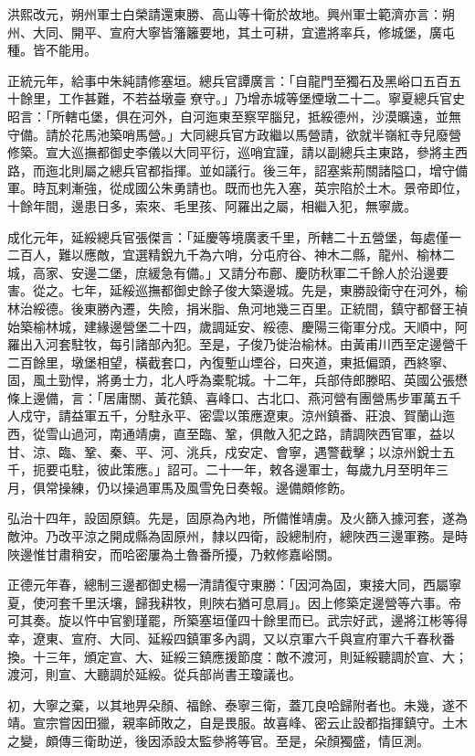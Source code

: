 洪熙改元，朔州軍士白榮請還東勝、高山等十衛於故地。興州軍士範濟亦言：朔州、大同、開平、宣府大寧皆籓籬要地，其土可耕，宜遣將率兵，修城堡，廣屯種。皆不能用。

正統元年，給事中朱純請修塞垣。總兵官譚廣言：「自龍門至獨石及黑峪口五百五十餘里，工作甚難，不若益墩臺尞守。」乃增赤城等堡煙墩二十二。寧夏總兵官史昭言：「所轄屯堡，俱在河外，自河迤東至察罕腦兒，抵綏德州，沙漠曠遠，並無守備。請於花馬池築哨馬營。」大同總兵官方政繼以馬營請，欲就半嶺紅寺兒廢營修築。宣大巡撫都御史李儀以大同平衍，巡哨宜謹，請以副總兵主東路，參將主西路，而迤北則屬之總兵官都指揮。並如議行。後三年，詔塞紫荊關諸隘口，增守備軍。時瓦剌漸強，從成國公朱勇請也。既而也先入塞，英宗陷於土木。景帝即位，十餘年間，邊患日多，索來、毛里孩、阿羅出之屬，相繼入犯，無寧歲。

成化元年，延綏總兵官張傑言：「延慶等境廣袤千里，所轄二十五營堡，每處僅一二百人，難以應敵，宜選精銳九千為六哨，分屯府谷、神木二縣，龍州、榆林二城，高家、安邊二堡，庶緩急有備。」又請分布鄜、慶防秋軍二千餘人於沿邊要害。從之。七年，延綏巡撫都御史餘子俊大築邊城。先是，東勝設衛守在河外，榆林治綏德。後東勝內遷，失險，捐米脂、魚河地幾三百里。正統間，鎮守都督王禎始築榆林城，建緣邊營堡二十四，歲調延安、綏德、慶陽三衛軍分戍。天順中，阿羅出入河套駐牧，每引諸部內犯。至是，子俊乃徙治榆林。由黃甫川西至定邊營千二百餘里，墩堡相望，橫截套口，內復塹山堙谷，曰夾道，東抵偏頭，西終寧、固，風土勁悍，將勇士力，北人呼為橐駝城。十二年，兵部侍郎滕昭、英國公張懋條上邊備，言：「居庸關、黃花鎮、喜峰口、古北口、燕河營有團營馬步軍萬五千人戍守，請益軍五千，分駐永平、密雲以策應遼東。涼州鎮番、莊浪、賀蘭山迤西，從雪山過河，南通靖虜，直至臨、鞏，俱敵入犯之路，請調陜西官軍，益以甘、涼、臨、鞏、秦、平、河、洮兵，戍安定、會寧，遇警截擊；以涼州銳士五千，扼要屯駐，彼此策應。」詔可。二十一年，敕各邊軍士，每歲九月至明年三月，俱常操練，仍以操過軍馬及風雪免日奏報。邊備頗修飭。

弘治十四年，設固原鎮。先是，固原為內地，所備惟靖虜。及火篩入據河套，遂為敵沖。乃改平涼之開成縣為固原州，隸以四衛，設總制府，總陜西三邊軍務。是時陜邊惟甘肅稍安，而哈密屢為土魯番所擾，乃敕修嘉峪關。

正德元年春，總制三邊都御史楊一清請復守東勝：「因河為固，東接大同，西屬寧夏，使河套千里沃壤，歸我耕牧，則陜右猶可息肩」。因上修築定邊營等六事。帝可其奏。旋以忤中官劉瑾罷，所築塞垣僅四十餘里而已。武宗好武，邊將江彬等得幸，遼東、宣府、大同、延綏四鎮軍多內調，又以京軍六千與宣府軍六千春秋番換。十三年，頒定宣、大、延綏三鎮應援節度：敵不渡河，則延綏聽調於宣、大；渡河，則宣、大聽調於延綏。從兵部尚書王瓊議也。

初，大寧之棄，以其地畀朵顏、福餘、泰寧三衛，蓋兀良哈歸附者也。未幾，遂不靖。宣宗嘗因田獵，親率師敗之，自是畏服。故喜峰、密云止設都指揮鎮守。土木之變，頗傳三衛助逆，後因添設太監參將等官。至是，朵顏獨盛，情叵測。

